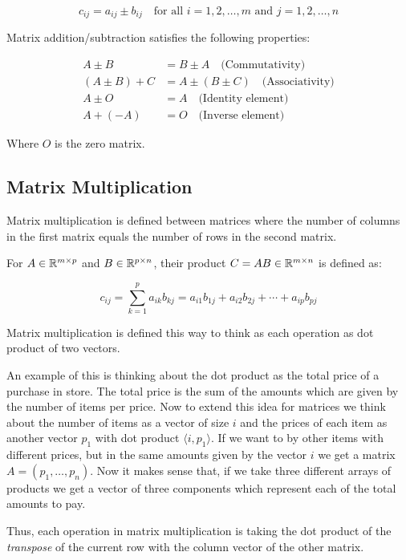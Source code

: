 \[
    c_{ij} = a_{ij} \pm b_{ij} \quad \text{for all } i = 1, 2, \ldots, m \text{ and } j = 1, 2, \ldots, n
\]

Matrix addition/subtraction satisfies the following properties:

\begin{align*}
    A \pm B &= B \pm A \quad \text{(Commutativity)} \\
    (A \pm B) + C &= A \pm (B \pm C) \quad \text{(Associativity)} \\
    A \pm O &= A \quad \text{(Identity element)} \\
    A + (-A) &= O \quad \text{(Inverse element)}
\end{align*}

Where \(O\) is the zero matrix.

\subsection{Matrix Multiplication}

Matrix multiplication is defined between matrices where the number of columns in the first 
matrix equals the number of rows in the second matrix.

For \(A \in \mathbb{R}^{m \times p}\) and \(B \in \mathbb{R}^{p \times n}\), their product \(C = AB \in \mathbb{R}^{m \times n}\) is defined as:

\[
    c_{ij} = \sum_{k=1}^{p} a_{ik}b_{kj} = a_{i1}b_{1j} + a_{i2}b_{2j} + \cdots + a_{ip}b_{pj}
\]

Matrix multiplication is defined this way to think as each operation as dot product of two vectors.
\vspace{\baselineskip}

An example of this is thinking about the dot product as the total price of a purchase in store. 
The total price is the sum of the amounts which are given by the number of items per price. Now to extend this idea 
for matrices we think about the number of items as a vector of size \(i\) and the prices of each item as 
another vector \(p_1\) with dot product \(\langle i, p_1 \rangle\). If we want to by other items with different prices, but in the 
same amounts given by the vector \(i\) we get a matrix \(A = (p_1, \dots, p_n)\). Now it makes sense that, if 
we take three different arrays of products we get a vector of three components which represent each of the 
total amounts to pay.
\vspace{\baselineskip}

Thus, each operation in matrix multiplication is taking the dot product of the \emph{transpose} 
of the current row with the column vector of the other matrix.

